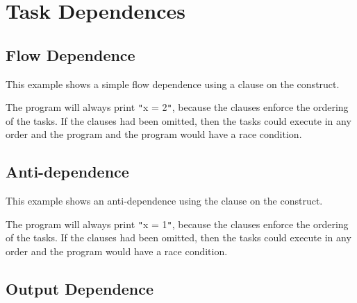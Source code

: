 \pagebreak
\section{Task Dependences}
\label{sec:task_depend}

\subsection{Flow Dependence}
\label{subsec:task_flow_depend}

This example shows a simple flow dependence using a  
clause on the  construct.



The program will always print \texttt{"}x = 2\texttt{"}, because the  
clauses enforce the ordering of the tasks. If the  clauses had been 
omitted, then the tasks could execute in any order and the program and the program 
would have a race condition.

\subsection{Anti-dependence}
\label{subsec:task_anti_depend}

This example shows an anti-dependence using the  
clause on the  construct.



The program will always print \texttt{"}x = 1\texttt{"}, because the  
clauses enforce the ordering of the tasks. If the  clauses had been 
omitted, then the tasks could execute in any order and the program would have a 
race condition.

\subsection{Output Dependence}
\label{subsec:task_out_depend}

